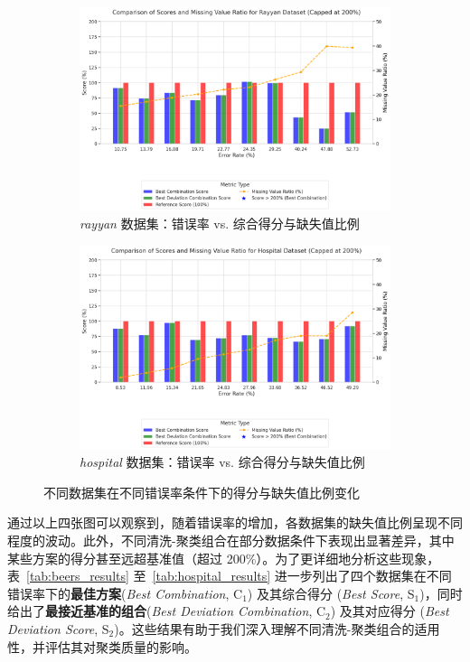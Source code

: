 \documentclass[10pt]{article} %
\numberwithin{equation}{section}
\begin{document}
\begin{figure}[htbp]
  \begin{subfigure}{0.48\linewidth}
    \centering
    \includegraphics[width=\linewidth]{rayyan_error.png}
    \caption{\textit{rayyan} 数据集：错误率 vs. 综合得分与缺失值比例}
    \label{fig:rayyan_error}
  \end{subfigure}
  \hfill
  \begin{subfigure}{0.48\linewidth}
    \centering
    \includegraphics[width=\linewidth]{hospital_error.png}
    \caption{\textit{hospital} 数据集：错误率 vs. 综合得分与缺失值比例}
    \label{fig:hospital_error}
  \end{subfigure}

  \caption{不同数据集在不同错误率条件下的得分与缺失值比例变化}
  \label{fig:all_datasets}
\end{figure}

\vspace{0.5em}
\noindent
通过以上四张图可以观察到，随着错误率的增加，各数据集的缺失值比例呈现不同程度的波动。此外，不同清洗-聚类组合在部分数据条件下表现出显著差异，其中某些方案的得分甚至远超基准值（超过 200\%）。为了更详细地分析这些现象，表~\ref{tab:beers_results} 至~\ref{tab:hospital_results} 进一步列出了四个数据集在不同错误率下的\textbf{最佳方案}(\textit{Best Combination}, C$_1$) 及其综合得分 (\textit{Best Score}, S$_1$)，同时给出了\textbf{最接近基准的组合}(\textit{Best Deviation Combination}, C$_2$) 及其对应得分 (\textit{Best Deviation Score}, S$_2$)。这些结果有助于我们深入理解不同清洗-聚类组合的适用性，并评估其对聚类质量的影响。
\end{document}
